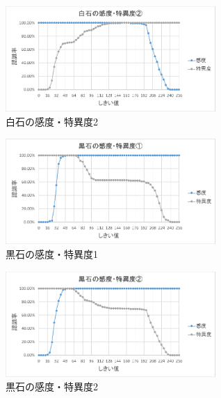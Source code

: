 \documentclass[openright]{nitocs}
\numberwithin{equation}{section}
\begin{document}
            \begin{figure}[tb] %
                \begin{center}
                \includegraphics[clip,width=80mm]{Case2_White_TPF_TNF.eps} 
                \caption{白石の感度・特異度2}
                \label{Case2White}
                \end{center}
            \end{figure}

            \begin{figure}[tb] %
                \begin{center}
                \includegraphics[clip,width=80mm]{Case1_Black_TPF_TNF.eps} 
                \caption{黒石の感度・特異度1}
                \label{Case1Black}
                \end{center}
            \end{figure}

            \begin{figure}[tb] %
                \begin{center}
                \includegraphics[clip,width=80mm]{Case2_Black_TPF_TNF.eps} 
                \caption{黒石の感度・特異度2}
                \label{Case2Black}
                \end{center}
            \end{figure}
\end{document}
